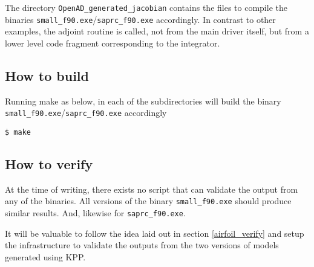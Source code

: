 \noindent The directory \texttt{OpenAD\_generated\_jacobian} contains the files to compile the binaries \texttt{small\_f90.exe}/\texttt{saprc\_f90.exe} accordingly. In contrast to other examples, the adjoint routine is called, not from the main driver itself, but from a lower level code fragment corresponding to the integrator.

\subsection{How to build}
Running make as below, in each of the subdirectories will build the binary \texttt{small\_f90.exe}/\texttt{saprc\_f90.exe} accordingly
\hfill\break
\begin{lstlisting}[language=mybash, numbers=none]
    $ make
\end{lstlisting}
\subsection{How to verify}
At the time of writing, there exists no script that can validate the output from any of the binaries. All versions of the binary \texttt{small\_f90.exe} should produce similar results. And, likewise for \texttt{saprc\_f90.exe}.\\

\begin{TodoPar}
\noindent It will be valuable to follow the idea laid out in section \ref{airfoil_verify} and setup the infrastructure to validate the outputs from the two versions of models generated using KPP.
\end{TodoPar}



